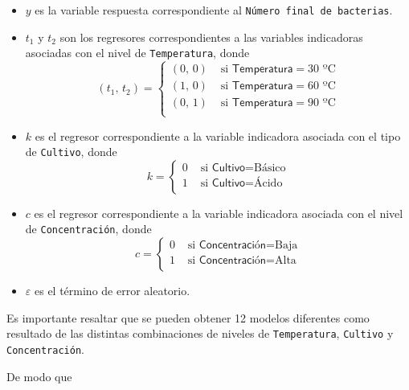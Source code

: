 \documentclass[10pt, spanish]{article}
\begin{document}
\begin{itemize}
\item
  \(y\) es la variable respuesta correspondiente al
  \texttt{Número\ final\ de\ bacterias}.
\item
  \(t_1\) y \(t_2\) son los regresores correspondientes a las variables
  indicadoras asociadas con el nivel de \texttt{Temperatura}, donde \[
  (t_1,\,t_2) = 
  \begin{cases}
  (0,\,0) & \text{ si } \textsf{Temperatura} = 30 \text{ ºC} \\
  (1,\,0) & \text{ si } \textsf{Temperatura} = 60 \text{ ºC} \\
  (0,\,1) & \text{ si } \textsf{Temperatura} = 90 \text{ ºC} \\
  \end{cases}
  \]
\item
  \(k\) es el regresor correspondiente a la variable indicadora asociada
  con el tipo de \texttt{Cultivo}, donde \[
  k = 
  \begin{cases}
  0 & \text{ si } \textsf{Cultivo} = \text{Básico} \\
  1 & \text{ si } \textsf{Cultivo} = \text{Ácido} \\
  \end{cases}
  \]
\item
  \(c\) es el regresor correspondiente a la variable indicadora asociada
  con el nivel de \texttt{Concentración}, donde \[
  c = 
  \begin{cases}
  0 & \text{ si } \textsf{Concentración} = \text{Baja} \\
  1 & \text{ si } \textsf{Concentración} = \text{Alta} \\
  \end{cases}
  \]
\item
  \(\varepsilon\) es el término de error aleatorio.
\end{itemize}

    Es importante resaltar que se pueden obtener 12 modelos diferentes como
resultado de las distintas combinaciones de niveles de
\texttt{Temperatura}, \texttt{Cultivo} y \texttt{Concentración}.

    De modo que
\end{document}
